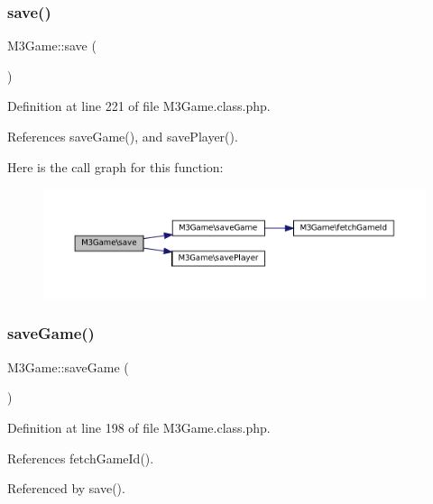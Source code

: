 \subsubsection{\texorpdfstring{save()}{save()}}
{\footnotesize\ttfamily M3\+Game\+::save (\begin{DoxyParamCaption}{ }\end{DoxyParamCaption})}



Definition at line 221 of file M3\+Game.\+class.\+php.



References save\+Game(), and save\+Player().

Here is the call graph for this function\+:\nopagebreak
\begin{figure}[H]
\begin{center}
\leavevmode
\includegraphics[width=350pt]{class_m3_game_a5743cdeed815caf98e1cc1df18d1e646_cgraph}
\end{center}
\end{figure}
\mbox{\label{class_m3_game_a1f48931de438241e2b54b40895fafd95}} 
\subsubsection{\texorpdfstring{save\+Game()}{saveGame()}}
{\footnotesize\ttfamily M3\+Game\+::save\+Game (\begin{DoxyParamCaption}{ }\end{DoxyParamCaption})}



Definition at line 198 of file M3\+Game.\+class.\+php.



References fetch\+Game\+Id().



Referenced by save().

